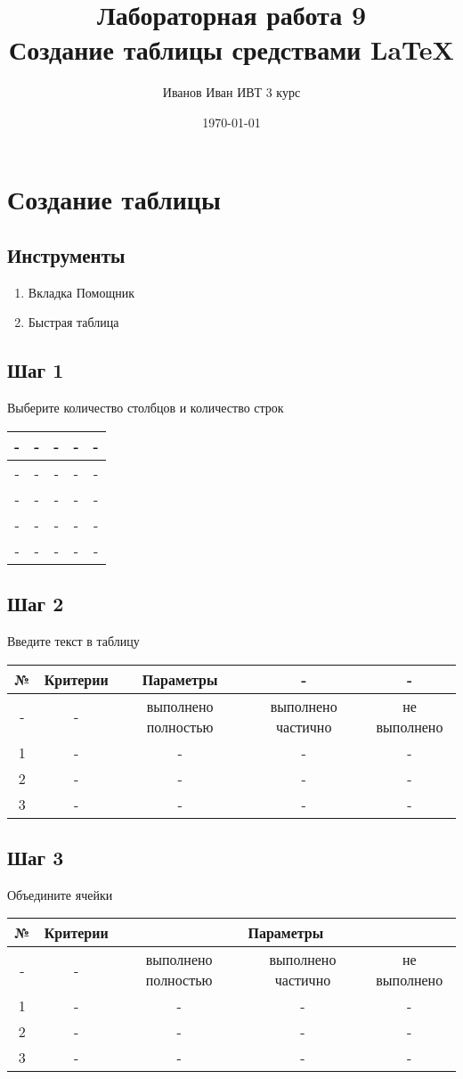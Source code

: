 \documentclass[a4paper,12pt]{article} %
\author{Иванов Иван ИВТ 3 курс}
\title{Лабораторная работа 9\\
Создание таблицы средствами \LaTeX{}}
\date{\today}
\begin{document}
\maketitle
\newpage

\section{Создание таблицы}
\subsection{Инструменты}
\begin{enumerate}
\item Вкладка Помощник
\item Быстрая таблица
\end{enumerate}
\subsection{Шаг 1}
Выберите количество столбцов и количество строк\\
\begin{tabular}{|c|c|c|c|c|}
\hline
- & - & - & - & - \\
\hline
- & - & - & - & - \\
\hline
- & - & - & - & - \\
\hline
- & - & - & - & - \\
\hline
- & - & - & - & - \\
\hline
\end{tabular}

\subsection{Шаг 2}
Введите текст в таблицу\\
\begin{tabular}{|c|c|c|c|c|}
\hline
№&Критерии&Параметры&-&-\\
\hline
-&-&выполнено полностью&выполнено частично&не выполнено\\
\hline
1&-&-&-&-\\
\hline
2&-&-&-&-\\
\hline
3&-&-&-&-\\
\hline
\end{tabular}

\subsection{Шаг 3}
Объедините ячейки\\
\begin{tabular}{|c|c|c|c|c|}
\hline
№&Критерии&\multicolumn{3}{|c|}{Параметры}\\
\hline
-&-&выполнено полностью&выполнено частично&не выполнено\\
\hline
1&-&-&-&-\\
\hline
2&-&-&-&-\\
\hline
3&-&-&-&-\\
\hline
\end{tabular}
\end{document}
